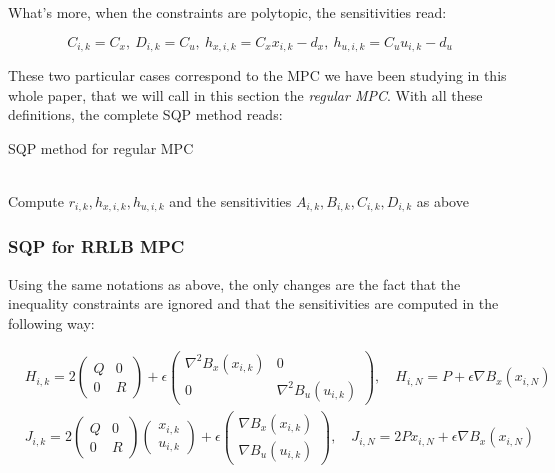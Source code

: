 \documentclass[12pt]{article}
\begin{document}
\noindent What's more, when the constraints are polytopic, the sensitivities read:

\begin{equation*}
	C_{i,k}=C_x,~D_{i,k}=C_u,~h_{x,i,k}=C_xx_{i,k}-d_x,~h_{u,i,k}=C_uu_{i,k}-d_u
\end{equation*}

These two particular cases correspond to the MPC we have been studying in this whole paper, that we will call in this section the \textit{regular MPC}.
With all these definitions, the complete SQP method reads:

\begin{algorithm}[H]
	\caption{SQP method for regular MPC}
	\label{algo:SQP-reg}
	\begin{algorithmic}[1]
	 
	 
	\\
		\qquad \quad Compute $r_{i,k}, h_{x,i,k}, h_{u,i,k}$ and the sensitivities $A_{i,k}, B_{i,k}, C_{i,k}, D_{i,k}$ as above
		 
	\EndWhile
	\EndProcedure
	\end{algorithmic}
\end{algorithm}

\subsubsection{SQP for RRLB MPC}

Using the same notations as above, the only changes are the fact that the inequality constraints are ignored and that the sensitivities are computed in the following way:

\begin{align*}
	&H_{i,k}=2\begin{pmatrix}Q&0\\0&R\end{pmatrix}+\epsilon\begin{pmatrix}\nabla^2B_x(x_{i,k})&0\\0&\nabla^2B_u(u_{i,k})\end{pmatrix},\quad H_{i,N}=P+\epsilon\nabla B_x(x_{i,N})\\
	&J_{i,k}=2\begin{pmatrix}Q&0\\0&R\end{pmatrix}\begin{pmatrix} x_{i,k}\\ u_{i,k}\end{pmatrix}+\epsilon\begin{pmatrix}\nabla B_x(x_{i,k})\\\nabla B_u(u_{i,k})\end{pmatrix},\quad J_{i,N}=2P x_{i,N}+\epsilon\nabla B_x(x_{i,N})
\end{align*}
\end{document}
